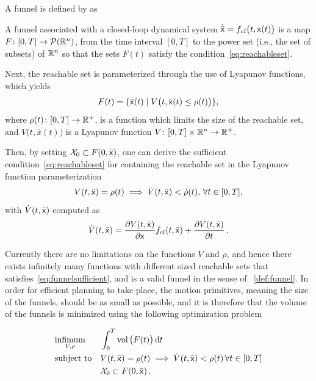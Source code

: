 A funnel is defined by \textcite{majumdarFunnelLibrariesRealtime2017} as
\begin{definition}
  \label{def:funnel}
  A funnel associated with a closed-loop dynamical system \(\dot{\bar{{\mathbf{\mathsf{x}}}}}
  = f_{\mathit{cl}}\big( t,{\mathbf{\mathsf{x}}}(t) \big) \) is a map \(F \colon [0,T]
  \rightarrow \mathcal{P}(\mathbb{R}^n)\), from the time interval \([0,T]\) to the power
  set (i.e., the set of subsets) of \(\mathbb{R}^n\) so that the sets \(F(t)\) satisfy
  the condition~\cref{eq:reachableset}.
\end{definition}

Next, the reachable set is parameterized through the use of Lyapunov functions,
which yields
\begin{equation}
  F(t) = \lbrace\bar{{\mathbf{\mathsf{x}}}}(t) \mid V \big(t, \bar{{\mathbf{\mathsf{x}}}}(t) \leq \rho (t) \big)\rbrace,
\end{equation}
where \(\rho (t) \colon [0,T] \rightarrow \mathbb{R}^+\), is a function which limits the
size of the reachable set, and \(V \big(t,\bar{x}(t) \big)\) is a Lyapunov function \(V
\colon [0,T] \times \mathbb{R}^n \rightarrow \mathbb{R}^+\).

Then, by setting \(\mathcal{X}_0 \subset F(0,\bar{{\mathbf{\mathsf{x}}}})\), one can derive
the sufficient condition~\cref{eq:reachableset} for containing the reachable set
in the Lyapunov function parameterization
\begin{equation}
  \label{eq:funnelsufficient}
  V(t,\bar{{\mathbf{\mathsf{x}}}}) = \rho(t) \implies \dot{V}(t,\bar{{\mathbf{\mathsf{x}}}}) < \dot{\rho}(t), \, \forall t \in [0,T],
\end{equation}
with \(\dot{V}(t,\bar{{\mathbf{\mathsf{x}}}})\) computed as
\begin{equation}
  \dot{V}(t,\bar{{\mathbf{\mathsf{x}}}}) = \frac{\partial V(t,\bar{{\mathbf{\mathsf{x}}}})}{\partial {\mathbf{\mathsf{x}}}} f_{cl}(t,\bar{{\mathbf{\mathsf{x}}}}) + \frac{\partial V(t,\bar{{\mathbf{\mathsf{x}}}})}{\partial t} \, .
\end{equation}

Currently there are no limitations on the functions \(V\) and \(\rho\), and
hence there exists infinitely many functions with different sized reachable sets
that satisfies~\cref{eq:funnelsufficient}, and is a valid funnel in the sense of
~\cref{def:funnel}. In order for efficient planning to take place, the motion
primitives, meaning the size of the funnels, should be as small as possible, and
it is therefore that the volume of the funnels is minimized using the following
optimization problem

\begin{align}
  \label{eq:funneloptimizationproblem}
  &\underset{V,\rho}{\text{infimum}} \; &&\int_{0}^{T} \operatorname{vol}\big( F(t) \big) \, \mathrm{d}t \\
  &\text{subject to} && V(t,\bar{{\mathbf{\mathsf{x}}}}) = \rho (t) \implies \dot{V}(t,\bar{{\mathbf{\mathsf{x}}}}) < \rho (t) \, \forall t \in [0,T] \nonumber \\
  && &\mathcal{X}_0 \subset F(0,\bar{{\mathbf{\mathsf{x}}}}) \, . \nonumber
\end{align} 

